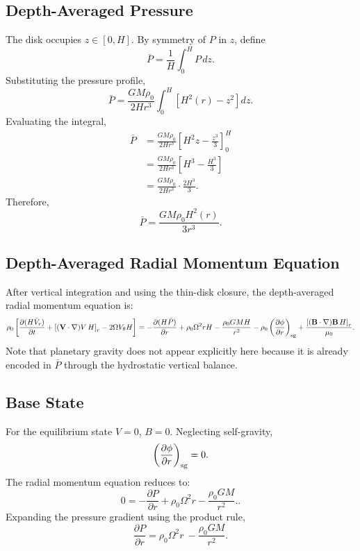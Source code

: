 \documentclass[11pt]{article}
\begin{document}
\subsection*{Depth-Averaged Pressure}

The disk occupies $z\in[0,H]$. By symmetry of $P$ in $z$, define
\begin{equation}
\bar{P} = \frac{1}{H}\int_0^{H} P\,dz.
\end{equation}
Substituting the pressure profile,
\begin{equation}
\bar{P}
= \frac{GM\rho_0}{2Hr^3}
\int_0^{H}\left[H^2(r)-z^2\right]dz.
\end{equation}
Evaluating the integral,
\begin{align}
\bar{P}
&= \frac{GM\rho_0}{2Hr^3}
\left[H^2 z - \frac{z^3}{3}\right]_0^{H} \\
&= \frac{GM\rho_0}{2Hr^3}
\left[H^3 - \frac{H^3}{3}\right] \\
&= \frac{GM\rho_0}{2Hr^3}\cdot\frac{2H^3}{3}.
\end{align}
Therefore,
\begin{equation}
\boxed{
\bar{P} = \frac{GM\rho_0 H^2(r)}{3r^3}.
}
\end{equation}

\subsection*{Depth-Averaged Radial Momentum Equation}

After vertical integration and using the thin-disk closure, the
depth-averaged radial momentum equation is:
\begin{equation}
\rho_0
\left[
\frac{\partial(H\bar{V}_r)}{\partial t}
+\left[(\mathbf{V}\cdot\nabla)V\,H\right]_r
-2\Omega V_\theta H
\right]
=
-\frac{\partial(H\bar{P})}{\partial r}+\rho_0\Omega^2 rH - \frac{\rho_0GMH}{r^2}
-\rho_0\left(\frac{\partial\phi}{\partial r}\right)_{\rm sg}
+\frac{\left[(\mathbf{B}\cdot\nabla)\mathbf{B}\,H\right]_r}{\mu_0}.
\end{equation}
Note that planetary gravity does not appear explicitly here
because it is already encoded in $\bar{P}$ through the
hydrostatic vertical balance.

\subsection*{Base State}

For the equilibrium state ${V}=0$, ${B}=0$.
Neglecting self-gravity,
\begin{equation}
\left(\frac{\partial\phi}{\partial r}\right)_{\rm sg}=0.
\end{equation}
The radial momentum equation reduces to:
\begin{equation}
0 = -\frac{\partial{P}}{\partial r} + \rho_0\Omega^2 r- \frac{\rho_0GM}{r^2}..
\end{equation}
Expanding the pressure gradient using the product rule,
\begin{equation}
\frac{\partial{P}}{\partial r}
= \rho_0\Omega^2 r\ - \frac{\rho_0GM}{r^2}.
\end{equation}
\end{document}
